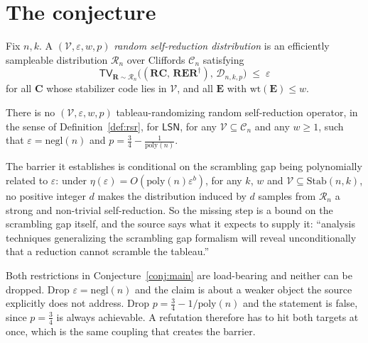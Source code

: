 \documentclass{conjura-conjecture}
\newcommand{\eps}{\varepsilon}
\newcommand{\LSN}{\mathsf{LSN}}
\newcommand{\Cliff}{\mathcal{C}}
\newcommand{\TV}{\mathsf{TV}}
\begin{document}
\section{The conjecture}\label{sec:conjectures}

\begin{definition}\label{def:rsr}
Fix $n, k$. A $(\mathcal{V}, \eps, w, p)$ \emph{random self-reduction
distribution} is an efficiently sampleable distribution $\mathcal{R}_{n}$
over Cliffords $\Cliff_{n}$ satisfying
\[
  \TV_{\mathbf{R} \sim \mathcal{R}_{n}}
  \bigl((\mathbf{R}\mathbf{C},\, \mathbf{R}\mathbf{E}\mathbf{R}^{\dagger}),\,
  \mathcal{D}_{n,k,p}\bigr) \;\le\; \eps
\]
for all $\mathbf{C}$ whose stabilizer code lies in $\mathcal{V}$, and all
$\mathbf{E}$ with $\mathrm{wt}(\mathbf{E}) \le w$.
\end{definition}

\begin{conjecture}\label{conj:main}
There is no $(\mathcal{V}, \eps, w, p)$ tableau-randomizing random
self-reduction operator, in the sense of Definition~\ref{def:rsr}, for
$\LSN$, for any $\mathcal{V} \subseteq \Cliff_{n}$ and any $w \ge 1$,
such that $\eps = \mathrm{negl}(n)$ and $p = \frac{3}{4} -
\frac{1}{\mathrm{poly}(n)}$.
\end{conjecture}

\begin{remark}\label{rem:conditional}
The barrier it establishes is conditional on the scrambling gap being
polynomially related to $\eps$: under $\eta(\eps) =
O(\mathrm{poly}(n)\eps^{b})$, for any $k$, $w$ and $\mathcal{V} \subseteq
\mathrm{Stab}(n,k)$, no positive integer $d$ makes the distribution
induced by $d$ samples from $\mathcal{R}_{n}$ a strong and non-trivial
self-reduction. So the missing step is a bound on the scrambling gap
itself, and the source says what it expects to supply it: ``analysis
techniques generalizing the scrambling gap formalism will reveal
unconditionally that a reduction cannot scramble the tableau.''
\end{remark}

\begin{remark}\label{rem:params}
Both restrictions in Conjecture~\ref{conj:main} are load-bearing and
neither can be dropped. Drop $\eps = \mathrm{negl}(n)$ and the claim is
about a weaker object the source explicitly does not address. Drop $p =
\frac{3}{4} - 1/\mathrm{poly}(n)$ and the statement is false, since $p =
\frac{3}{4}$ is always achievable. A refutation therefore has to hit both
targets at once, which is the same coupling that creates the barrier.
\end{remark}
\end{document}
